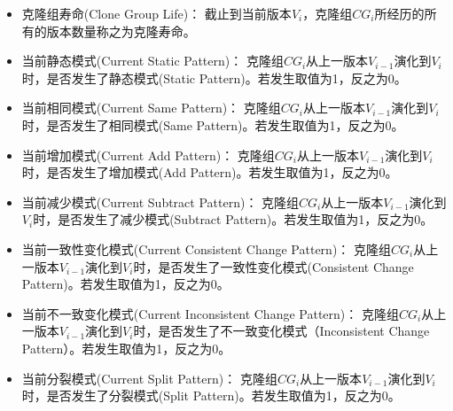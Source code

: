 \begin{itemize}
\item
克隆组寿命(Clone Group Life)：
截止到当前版本$V_ i $，克隆组$CG_i$所经历的所有的版本数量称之为克隆寿命。
\item
当前静态模式(Current Static Pattern)：
克隆组$CG_i$从上一版本$V_{i-1} $演化到$V_i $时，是否发生了静态模式(Static Pattern)。若发生取值为1，反之为0。
\item
当前相同模式(Current Same Pattern)：
克隆组$CG_i$从上一版本$V_{i-1} $演化到$V_i $时，是否发生了相同模式(Same Pattern)。若发生取值为1，反之为0。
\item
当前增加模式(Current Add Pattern)：
克隆组$CG_i$从上一版本$V_{i-1} $演化到$V_i $时，是否发生了增加模式(Add Pattern)。若发生取值为1，反之为0。
\item
当前减少模式(Current Subtract Pattern)：
克隆组$CG_i$从上一版本$V_{i-1} $演化到$V_i $时，是否发生了减少模式(Subtract Pattern)。若发生取值为1，反之为0。
\item
当前一致性变化模式(Current Consistent Change Pattern)：
克隆组$CG_i$从上一版本$V_{i-1} $演化到$V_i $时，是否发生了一致性变化模式(Consistent Change Pattern)。若发生取值为1，反之为0。
\item
当前不一致变化模式(Current Inconsistent Change Pattern)：
克隆组$CG_i$从上一版本$V_{i-1} $演化到$V_ i $时，是否发生了不一致变化模式（Inconsistent Change Pattern）。若发生取值为1，反之为0。
\item
当前分裂模式(Current Split Pattern)：
克隆组$CG_i$从上一版本$V_{i-1} $演化到$V_i $时，是否发生了分裂模式(Split Pattern)。若发生取值为1，反之为0。
\end{itemize}

